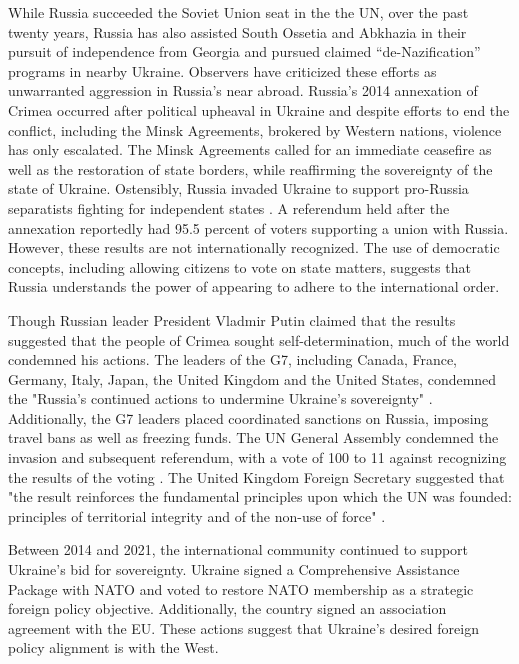 \documentclass[12pt]{article}
\begin{document}
While Russia succeeded the Soviet Union seat in the the UN, over the past twenty years, Russia has also assisted South Ossetia and Abkhazia in their pursuit of independence from Georgia and pursued claimed ``de-Nazification'' programs in nearby Ukraine. Observers have criticized these efforts as unwarranted aggression in Russia's near abroad. Russia's 2014 annexation of Crimea occurred after political upheaval in Ukraine and despite efforts to end the conflict, including the Minsk Agreements, brokered by Western nations, violence has only escalated. The Minsk Agreements called for an immediate ceasefire as well as the restoration of state borders, while reaffirming the sovereignty of the state of Ukraine. Ostensibly, Russia invaded Ukraine to support pro-Russia separatists fighting for independent states \citep{walker_conflict_2023}. A referendum held after the annexation reportedly had 95.5 percent of voters supporting a union with Russia. However, these results are not internationally recognized. The use of democratic concepts, including allowing citizens to vote on state matters, suggests that Russia understands the power of appearing to adhere to the international order. 

Though Russian leader President Vladmir Putin claimed that the results suggested that the people of Crimea sought self-determination, much of the world condemned his actions. The leaders of the G7, including Canada, France, Germany, Italy, Japan, the United Kingdom and the United States, condemned the "Russia's continued actions to undermine Ukraine's sovereignty" \citep{foreign_and_commonwealth_office_g7_2014}. Additionally, the G7 leaders placed coordinated sanctions on Russia, imposing travel bans as well as freezing funds. The UN General Assembly condemned the invasion and subsequent referendum, with a vote of 100 to 11 against recognizing the results of the voting \citep{gumuchian_un_2014}. The United Kingdom Foreign Secretary suggested that "the result reinforces the fundamental principles upon which the UN was founded: principles of territorial integrity and of the non-use of force" \citep{walker_conflict_2023}.

Between 2014 and 2021, the international community continued to support Ukraine's bid for sovereignty. Ukraine signed a Comprehensive Assistance Package with NATO and voted to restore NATO membership as a strategic foreign policy objective. Additionally, the country signed an association agreement with the EU. These actions suggest that Ukraine's desired foreign policy alignment is with the West. 
\end{document}
